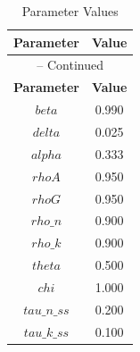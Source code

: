 \begin{center}
\begin{longtable}{cc}
\caption{Parameter Values}\\%
\toprule%
\multicolumn{1}{c}{\textbf{Parameter}} &
\multicolumn{1}{c}{\textbf{Value}}  \\%
\midrule%
\endfirsthead
\multicolumn{2}{c}{{\tablename} \thetable{} -- Continued}\\%
\midrule%
\multicolumn{1}{c}{\textbf{Parameter}} &
\multicolumn{1}{c}{\textbf{Value}} \\%
\midrule%
\endhead
$beta$ 	 & 	 0.990 \\
$delta$ 	 & 	 0.025 \\
$alpha$ 	 & 	 0.333 \\
$rhoA$ 	 & 	 0.950 \\
$rhoG$ 	 & 	 0.950 \\
$rho\_n$ 	 & 	 0.900 \\
$rho\_k$ 	 & 	 0.900 \\
$theta$ 	 & 	 0.500 \\
$chi$ 	 & 	 1.000 \\
$tau\_n\_ss$ 	 & 	 0.200 \\
$tau\_k\_ss$ 	 & 	 0.100 \\
\bottomrule%
\end{longtable}
\end{center}
